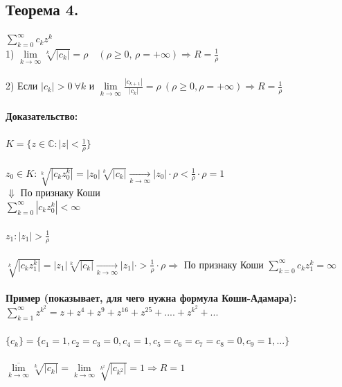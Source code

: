 \documentclass[a4paper,12pt]{article} %
\begin{document}
 \subsection*{Теорема 4.}
 $\sum\limits_{k = 0}^\infty c_k z^k$ \\
 1) $\lim\limits_{k \to \infty} \sqrt[k]{|c_k|} = \rho \quad (\rho \geqslant 0,\, \rho = +\infty) \Rightarrow R =  \frac{1}{\rho}$ \\
 \ \\
 2) Если $|c_k| > 0 \  \forall k \text{ и } \lim\limits_{k \to \infty} \frac{|c_{k+1}|}{|c_k|} = \rho \ (\rho \geqslant 0, \rho = +\infty) \Rightarrow R = \frac{1}{\rho}$\\
 \ \\
 \noindent\textbf{Доказательство:}\\
 \ \\
 $K = \{z \in \mathbb{C}: |z| < \frac{1}{\rho} \}$ \\
 \ \\
 $z_0 \in K: \sqrt[k]{|c_k z_0^k|} = |z_0| \sqrt[k]{|c_k|} \underset{k \to \infty}{\longrightarrow} |z_0| \cdot \rho < \frac{1}{\rho} \cdot \rho = 1 $\\
\hspace*{3 cm} $\Downarrow$ По признаку Коши \\
\hspace*{3 cm}$\sum\limits_{k = 0}^\infty |c_k z_0^k| < \infty$\\
\ \\
$z_1: |z_1| > \frac{1}{\rho}$\\
\ \\
$\sqrt[k]{|c_k z_1^k|} = |z_1| \sqrt[k]{|c_k|} \underset{k \to \infty}{\longrightarrow} |z_1| \cdot > \frac{1}{\rho} \cdot \rho \Rightarrow
$ По признаку Коши $\sum\limits_{k = 0}^\infty c_k z_1^k = \infty$\\
\ \\
\noindent\textbf{Пример (показывает, для чего нужна формула Коши-Адамара):}\\
$\sum\limits_{k = 1}^\infty z^{k^2} = z + z^4 + z^9 + z^{16} + z^{25} + .... + z^{k^2} + ...
$\\
\ \\
$ \{c_k\} = \{ c_1 = 1, c_2 = c_3 = 0, c_4 = 1, c_5 = c_6 = c_7 = c_8 = 0, c_9 = 1, ... \} $\\
\ \\
$\overline{\lim\limits_{k \to \infty}} \sqrt[k]{|c_k|} = \lim\limits_{k \to \infty} \sqrt[k^2]{|c_{k^2}|} = 1 \Rightarrow R = 1 $
\end{document}
